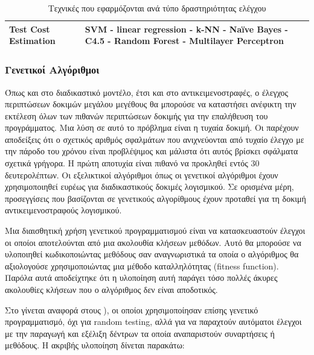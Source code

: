 \documentclass[12pt]{article}
\begin{document}
\begin{table}[]
\begin{tabular}{|p{}|p{}|}
Test Cost Estimation               & SVM - linear regression - k-NN - Naïve Bayes - C4.5 - Random Forest - Multilayer Perceptron                                                                                                                                                                                                            \\ \hline
\end{tabular}
\caption{Τεχνικές που εφαρμόζονται ανά τύπο δραστηριότητας ελέγχου}
\end{table}

\subsubsection{Γενετικοί Αλγόριθμοι}

Όπως και στο διαδικαστικό μοντέλο, έτσι και στο αντικειμενοστραφές, ο έλεγχος περιπτώσεων δοκιμών μεγάλου μεγέθους θα μπορούσε να καταστήσει ανέφικτη την εκτέλεση όλων των πιθανών περιπτώσεων δοκιμής για την επαλήθευση του προγράμματος. Μια λύση σε αυτό το πρόβλημα είναι η τυχαία δοκιμή. Οι \textcite{ciupa} παρέχουν αποδείξεις ότι ο σχετικός αριθμός σφαλμάτων που ανιχνεύονται από τυχαίο έλεγχο με την πάροδο του χρόνου είναι προβλέψιμος και μάλιστα ότι αυτός βρίσκει σφάλματα σχετικά γρήγορα. Η πρώτη αποτυχία είναι πιθανό να προκληθεί εντός 30 δευτερολέπτων. Οι εξελικτικοί αλγόριθμοι όπως οι γενετικοί αλγόριθμοι έχουν χρησιμοποιηθεί ευρέως για διαδικαστικούς δοκιμές λογισμικού. Σε ορισμένα μέρη, προσεγγίσεις που βασίζονται σε γενετικούς αλγορίθμους έχουν προταθεί για τη δοκιμή αντικειμενοστραφούς λογισμικού.

\par Μια διαισθητική χρήση γενετικού προγραμματισμού είναι να κατασκευαστούν έλεγχοι οι οποίοι αποτελούνται από μια ακολουθία κλήσεων μεθόδων. Αυτό θα μπορούσε να υλοποιηθεί κωδικοποιώντας μεθόδους σαν αναγνωριστικά τα οποία ο αλγόριθμος θα αξιολογούσε χρησιμοποιώντας μια μέθοδο καταλληλότητας (fitness function). Παρόλα αυτά αποδείχτηκε ότι η υλοποίηση αυτή παράγει τόσο πολλές άκυρες ακολουθίες κλήσεων που ο αλγόριθμος δεν είναι αποδοτικός.

\par Στο \textcite{meziane} γίνεται αναφορά στους \textcite{wappler}), οι οποίοι χρησιμοποίησαν επίσης γενετικό προγραμματισμό, όχι για random testing, αλλά για να παραχτούν αυτόματοι έλεγχοι με την παραγωγή και εξέλιξη δέντρων τα οποία αναπαριστούν συναρτήσεις ή μεθόδους. Η ακριβής υλοποίηση δίνεται παρακάτω:
\end{document}
